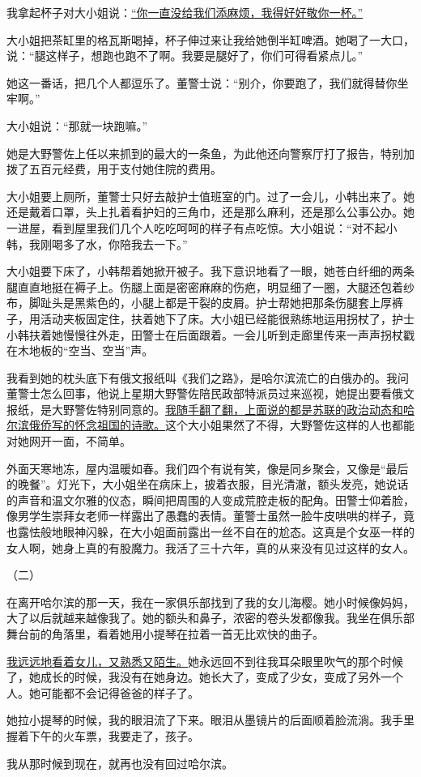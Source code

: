 \documentclass[11pt,a4paper]{ctexart}
\begin{document}
\begin{materialtext}
我拿起杯子对大小姐说：\uline{“你一直没给我们添麻烦，我得好好敬你一杯。”}

大小姐把茶缸里的格瓦斯喝掉，杯子伸过来让我给她倒半缸啤酒。她喝了一大口，说：“腿这样子，想跑也跑不了啊。我要是腿好了，你们可得看紧点儿。”

她这一番话，把几个人都逗乐了。董警士说：“别介，你要跑了，我们就得替你坐牢啊。”

大小姐说：“那就一块跑嘛。”

她是大野警佐上任以来抓到的最大的一条鱼，为此他还向警察厅打了报告，特别加拨了五百元经费，用于支付她住院的费用。

大小姐要上厕所，董警士只好去敲护士值班室的门。过了一会儿，小韩出来了。她还是戴着口罩，头上扎着看护妇的三角巾，还是那么麻利，还是那么公事公办。她一进屋，看到屋里我们几个人吃吃呵呵的样子有点吃惊。大小姐说：“对不起小韩，我刚喝多了水，你陪我去一下。”

大小姐要下床了，小韩帮着她掀开被子。我下意识地看了一眼，她苍白纤细的两条腿直直地挺在褥子上。伤腿上面是密密麻麻的伤疤，明显细了一圈，大腿还包着纱布，脚趾头是黑紫色的，小腿上都是干裂的皮屑。护士帮她把那条伤腿套上厚裤子，用活动夹板固定住，扶着她下了床。大小姐已经能很熟练地运用拐杖了，护士小韩扶着她慢慢往外走，田警士在后面跟着。一会儿听到走廊里传来一声声拐杖戳在木地板的“空当、空当”声。

我看到她的枕头底下有俄文报纸叫《我们之路》，是哈尔滨流亡的白俄办的。我问董警士怎么回事，他说上星期大野警佐陪民政部特派员过来巡视，她提出要看俄文报纸，是大野警佐特别同意的。\uline{我随手翻了翻，上面说的都是苏联的政治动态和哈尔滨俄侨写的怀念祖国的诗歌。}这个大小姐果然了不得，大野警佐这样的人也都能对她网开一面，不简单。

外面天寒地冻，屋内温暖如春。我们四个有说有笑，像是同乡聚会，又像是“最后的晚餐”。灯光下，大小姐坐在病床上，披着衣服，目光清澈，额头发亮，她说话的声音和温文尔雅的仪态，瞬间把周围的人变成荒腔走板的配角。田警士仰着脸，像男学生崇拜女老师一样露出了愚蠢的表情。董警士虽然一脸牛皮哄哄的样子，竟也露怯般地眼神闪躲，在大小姐面前露出一丝不自在的尬态。这真是个女巫一样的女人啊，她身上真的有股魔力。我活了三十六年，真的从来没有见过这样的女人。

（二）

在离开哈尔滨的那一天，我在一家俱乐部找到了我的女儿海樱。她小时候像妈妈，大了以后就越来越像我了。她的额头和鼻子，浓密的卷头发都像我。我坐在俱乐部舞台前的角落里，看着她用小提琴在拉着一首无比欢快的曲子。

\uline{我远远地看着女儿，又熟悉又陌生。}她永远回不到往我耳朵眼里吹气的那个时候了，她成长的时候，我没有在她身边。她长大了，变成了少女，变成了另外一个人。她可能都不会记得爸爸的样子了。

她拉小提琴的时候，我的眼泪流了下来。眼泪从墨镜片的后面顺着脸流淌。我手里握着下午的火车票，我要走了，孩子。


我从那时候到现在，就再也没有回过哈尔滨。
\end{materialtext}
\end{document}
